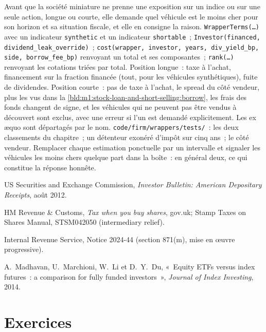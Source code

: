 \begin{build}
 Avant que la société miniature ne prenne une exposition sur un indice ou
sur une seule action, longue ou courte, elle demande quel véhicule est le moins cher pour
son horizon et sa situation fiscale, et elle en consigne la raison.
 \texttt{WrapperTerms(\ldots)} avec un indicateur \texttt{synthetic}
et un indicateur \texttt{shortable}~; \texttt{Investor(financed,
dividend\_leak\_override)}~; \texttt{cost(wrapper, investor, years,
div\_yield\_bp, side, borrow\_fee\_bp)} renvoyant un total et ses composantes~;
\texttt{rank(\ldots)} renvoyant les cotations triées par total.
 Position longue~: taxe à l'achat, financement sur la fraction financée
(tout, pour les véhicules synthétiques), fuite de dividendes. Position courte~: pas de taxe à l'achat, le
spread du côté vendeur, plus les  vus dans la
\cref{bld:m1:stock-loan-and-short-selling:borrow}, les frais des fonds changent de signe, et
les véhicules qui ne peuvent pas être vendus à découvert sont exclus, avec une erreur si l'un est
demandé explicitement. Les ex æquo sont départagés par le nom.
 \texttt{code/firm/wrappers/tests/}~: les deux classements du
chapitre~; un détenteur exonéré d'impôt sur cinq ans~; le côté vendeur.
 Remplacer chaque estimation ponctuelle par un intervalle et signaler les
véhicules les moins chers quelque part dans la boîte~: en général deux, ce qui constitue la
réponse honnête.
\end{build}

\begin{omsources}
\item US Securities and Exchange Commission, \emph{Investor Bulletin:
American Depositary Receipts}, août 2012.
\item HM Revenue \& Customs, \emph{Tax when you buy shares}, gov.uk; Stamp
Taxes on Shares Manual, STSM042050 (intermediary relief).
\item Internal Revenue Service, Notice 2024-44 (section 871(m), mise en œuvre progressive).
\item A.~Madhavan, U.~Marchioni, W.~Li et D.~Y.~Du, «~Equity ETFs versus
index futures~: a comparison for fully funded investors~», \emph{Journal of
Index Investing}, 2014.
\end{omsources}

\section{Exercices}


